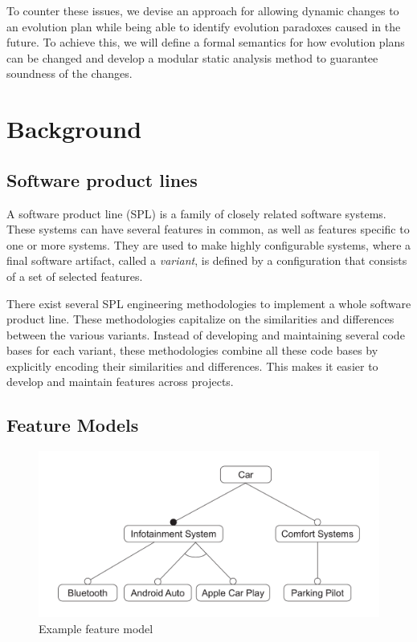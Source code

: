 \documentclass[a4paper,english]{ifimaster}
\begin{document}
To counter these issues, we devise an approach for allowing dynamic changes to an evolution plan while being able to identify evolution paradoxes caused in the future. To achieve this, we will define a formal semantics for how evolution plans can be changed and develop a modular static analysis method to guarantee soundness of the changes.

\chapter{Background}%
\label{cha:background}

\section{Software product lines}%
\label{sec:software-product-lines}

A software product line (SPL) is a family of closely related software systems. These systems can have several features in common, as well as features specific to one or more systems. They are used to make highly configurable systems, where a final software artifact, called a \emph{variant}, is defined by a configuration that consists of a set of selected features. 

There exist several SPL engineering methodologies to implement a whole software product line. These methodologies capitalize on the similarities and differences between the various variants. Instead of developing and maintaining several code bases for each variant, these methodologies combine all these code bases by explicitly encoding their similarities and differences. This makes it easier to develop and maintain features across projects.


\section{Feature Models}
\label{sec:feature-models}

\begin{figure}
  \includegraphics[width=\textwidth]{illustrations/example.pdf}
  \caption{Example feature model \label{fig:feature-model}}
\end{figure}
\end{document}
